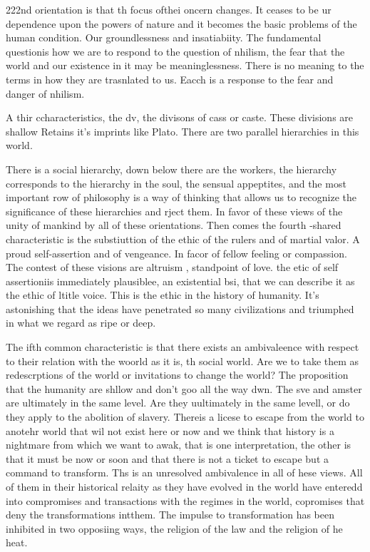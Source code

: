 \documentclass[12pt,letterpaper]{article}
\begin{document}
222nd orientation is that th focus ofthei oncern changes.  It ceases to be ur dependence upon the powers of nature and it becomes the basic problems of the human condition.  Our groundlessness and insatiabiity.  The fundamental questionis how we are to respond to the question of nhilism, the fear that the world and our existence  in it may be meaninglessness.  There is no meaning to the terms in how they are trasnlated to us.  Eacch is a response to the fear and danger of nhilism.

A thir ccharacteristics, the dv, the divisons of cass or caste.  These divisions are shallow
Retains it's imprints like Plato.  There are two parallel hierarchies in this world.  

There is a social hierarchy, down below there are the workers, the hierarchy corresponds to the hierarchy in the soul, the sensual appeptites, and the most important row of philosophy is a way of thinking that allows us to recognize the significance of these hierarchies and rject them.  In favor of these views of the unity of mankind by all of these orientations.  Then comes the fourth -shared characteristic is the substiuttion of the ethic of the rulers and of martial valor.  A proud self-assertion and of vengeance.  In facor of fellow feeling or compassion.  The contest of these visions are altruism , standpoint of love.  the etic of self assertioniis immediately plausiblee, an existential bsi, that we can describe it as the ethic of ltitle voice.  This is the ethic in the history of humanity.   It's astonishing that the ideas have penetrated so many civilizations and triumphed in what we regard as ripe or deep.  

The ifth common characteristic is that there exists an ambivaleence with respect to their relation with the woorld as it is, th social world.  Are we to take them as redescrptions of the world or invitations to change the world?  The proposition that the humanity are shllow and don't goo all the way dwn.  The sve and amster are ultimately in the same level.  Are they uultimately in the same levell, or do they apply to the abolition of slavery.  Thereis a licese to escape from the world to anotehr world that wil not exist here or now and we think that history is a nightmare from which we want to awak, that is one interpretation, the other is that it must be now or soon and that there is not a ticket to escape but a command to transform.  Ths is an unresolved ambivalence in all of hese views.  All of them in their historical relaity as they have evolved in the world have enteredd into compromises and transactions with the regimes in the world, copromises that deny the transformations intthem.  The impulse to transformation has been inhibited in two opposiing ways, the religion of the law and the religion of he heat.
\end{document}
